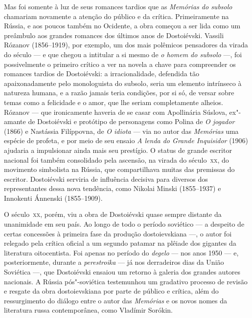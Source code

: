 Mas foi somente à luz de seus romances tardios que as \textit{Memórias do
subsolo} chamariam novamente a atenção do público e da crítica.  Primeiramente
na Rússia, e aos poucos também no Ocidente, a obra começou a ser lida como um
preâmbulo aos grandes romances dos últimos anos de Dostoiévski. Vassili Rózanov
(1856--1919), por exemplo, um dos mais polêmicos pensadores da virada do século
--- e que chegou a intitular a si mesmo de \textit{o homem do subsolo} ---, foi
possivelmente o primeiro crítico a ver na novela a chave para compreender os
romances tardios de Dostoiévski: a irracionalidade, defendida tão
apaixonadamente pelo monologuista do subsolo, seria um elemento
intrínseco à natureza humana, e a razão jamais teria condições, por si só, de
versar sobre temas como a felicidade e o amor, que lhe seriam completamente
alheios. Rózanov --- que ironicamente haveria de se casar com Apollinária
Súslova, ex"-amante de Dostoiévski e protótipo de personagens como Polina de
\textit{O jogador} (1866) e Nastássia Filíppovna, de \textit{O idiota} --- via no
autor das \textit{Memórias} uma espécie de profeta, e por meio de seu ensaio \textit{A
lenda do Grande Inquisidor} (1906) ajudaria a impulsionar ainda mais seu
prestígio. O status de grande escritor nacional foi também consolidado pela
ascensão, na virada do século~\textsc{xx}, do movimento simbolista na Rússia, que
compartilhava muitas das premissas do escritor. Dostoiévski serviria de
influência decisiva para diversos dos representantes dessa nova tendência, como
Nikolai Minski (1855--1937) e Innokenti Ánnenski (1855--1909).

O século~\textsc{xx}, porém, viu a obra de Dostoiévski quase sempre distante da
unanimidade em seu país. Ao longo de todo o período soviético --- a despeito de
certas concessões à primeira fase da produção dostoievskiana ---, o autor foi
relegado pela crítica oficial a um segundo patamar na plêiade dos gigantes da
literatura oitocentista. Foi apenas no período do \textit{degelo} --- nos anos
1950 --- e, posteriormente, durante a \textit{perestroika} --- já nos derradeiros
dias da União Soviética ---, que Dostoiévski ensaiou um retorno à galeria dos
grandes autores nacionais. A Rússia pós"-soviética testemunhou
um gradativo processo de revisão e resgate da obra dostoievskiana
por parte de público e crítica, além do ressurgimento do diálogo entre o autor
das \textit{Memórias} e os novos nomes da literatura russa contemporânea, como
Vladímir Sorókin.

